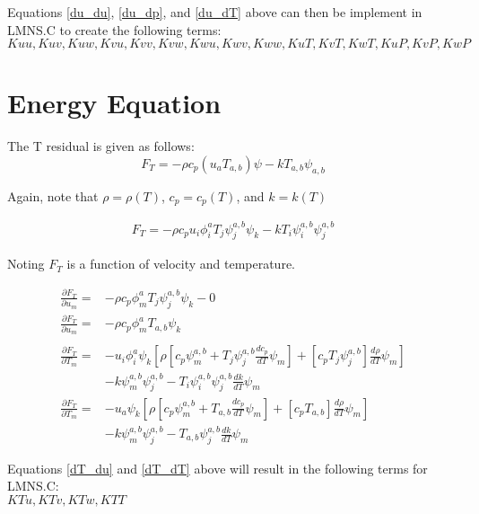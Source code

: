 \documentclass[10pt]{article}
\begin{document}
Equations \ref{du_du}, \ref{du_dp}, and \ref{du_dT} above can then be implement in LMNS.C to create the following terms:\\
$Kuu, Kuv, Kuw, Kvu, Kvv, Kvw, Kwu, Kwv, Kww, KuT, KvT, KwT, KuP, KvP, KwP$


\section{Energy Equation}
The T residual is given as follows:
\begin{equation}
    F_T = -\rho c_p (u_a T_{a,b})\psi - k T_{a,b} \psi_{a,b}
\end{equation}

Again, note that $\rho = \rho(T)$, $c_p = c_p(T)$, and $k = k(T)$

\begin{align}
    F_T = -\rho c_p u_i \phi_i^a T_j \psi_j^{a,b} \psi_k - k T_i \psi_i^{a,b} \psi_j^{a,b}
\end{align}

Noting $F_T$ is a function of velocity and temperature.

\begin{align}
    \frac{\partial F_T}{\partial u_m} = &-\rho c_p \phi_m^a T_j \psi_j^{a,b} \psi_k - 0 \nonumber \\
    \frac{\partial F_T}{\partial u_m} = &-\rho c_p \phi_m^a T_{a,b} \psi_k \label{dT_du} \\
    \nonumber \\
    \frac{\partial F_T}{\partial T_m} = &-u_i \phi_i^a \psi_k \left [ \rho [ c_p \psi_m^{a,b} + T_j \psi_j^{a,b} \frac{d c_p}{dT} \psi_m ] + [ c_p T_j \psi_j^{a,b} ] \frac{d \rho}{dT} \psi_m  \right ] \nonumber \\
                                      &- k \psi_m^{a,b} \psi_j^{a,b} - T_i \psi_i^{a,b} \psi_j^{a,b} \frac{dk}{dT} \psi_m \\
    \frac{\partial F_T}{\partial T_m} = &-u_a \psi_k \left [ \rho [ c_p \psi_m^{a,b} + T_{a,b} \frac{d c_p}{dT} \psi_m ] + [ c_p T_{a,b} ] \frac{d \rho}{dT} \psi_m  \right ] \nonumber \\
                                      &- k \psi_m^{a,b} \psi_j^{a,b} - T_{a,b} \psi_j^{a,b} \frac{dk}{dT} \psi_m \label{dT_dT}
\end{align}

Equations \ref{dT_du} and \ref{dT_dT} above will result in the following terms for LMNS.C:\\
$KTu, KTv, KTw, KTT$
\end{document}
